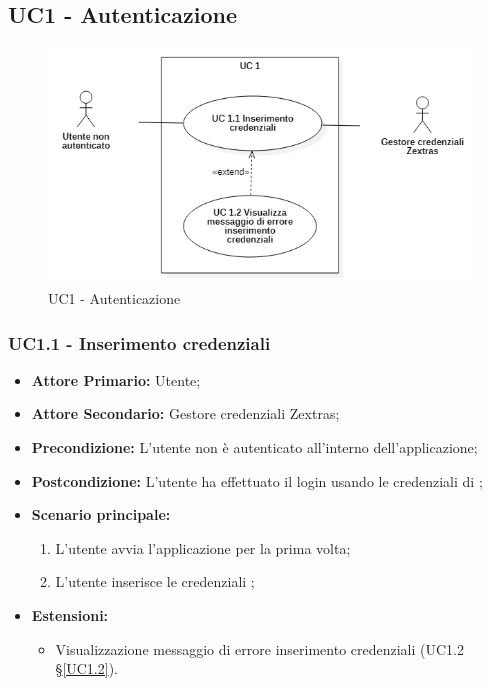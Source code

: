 \subsection{UC1 - Autenticazione}
\begin{figure}[H]
    \centering
    \includegraphics[scale = 0.7]{components/img/UC1.png}
    \caption{UC1 - Autenticazione}
\end{figure}
\subsubsection{UC1.1 - Inserimento credenziali}
\begin{itemize}
\item \textbf{Attore Primario:} Utente;
\item \textbf{Attore Secondario:} Gestore credenziali Zextras;
\item \textbf{Precondizione:} L'utente non è autenticato all'interno dell'applicazione;
\item \textbf{Postcondizione:} L'utente ha effettuato il login usando le credenziali di ;
\item \textbf{Scenario principale:}
    \begin{enumerate}
    \item L'utente avvia l'applicazione per la prima volta;
    \item L'utente inserisce le credenziali ;
    \end{enumerate}
\item \textbf{Estensioni:}
\begin{itemize}
\item Visualizzazione messaggio di errore inserimento credenziali (UC1.2 \S{}\ref{UC1.2}).
\end{itemize}
\end{itemize}

